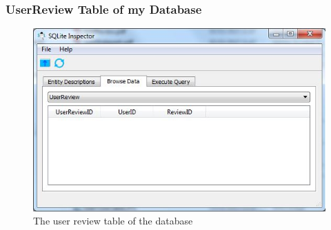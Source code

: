 \subsubsection{UserReview Table of my Database}
\begin{figure}[H]
    \includegraphics[width=\textwidth]{./Maintenance/Figures/UserReviewTable.jpg}
    \caption{The user review table of the database} \label{fig:UserReview Table}
\end{figure}


